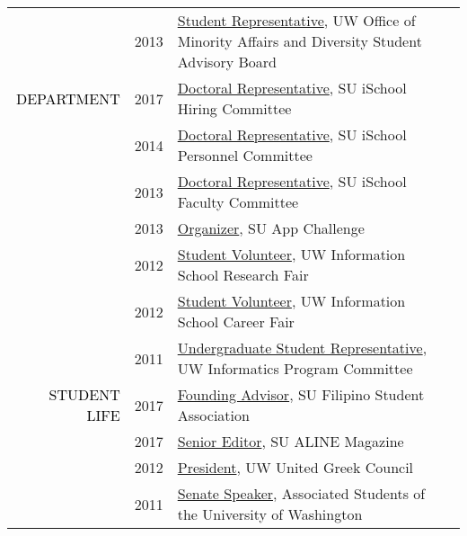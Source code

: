 \documentclass[12pt]{article}
\begin{document}
{{\begin{longtable}{Rp{1.0in}p{0.25in}p{4.75in}}
& \footnotesize{2013} & \href{http://www.washington.edu/omad/2014/05/09/no-longer-invisible-bryan-dosono/}{{Student Representative}}, UW Office of Minority Affairs and Diversity Student Advisory Board \\

\textcolor{black}{\footnotesize{\uppercase{Department}}} & \footnotesize{2017} & 
 \href{http://ischool.syr.edu/facstaff/}{{Doctoral Representative}}, SU iSchool Hiring Committee \\

& \footnotesize{2014} & \href{http://ischool.syr.edu/facstaff/}{{Doctoral Representative}}, SU iSchool Personnel Committee \\

& \footnotesize{2013} & \href{http://ischool.syr.edu/facstaff/}{{Doctoral Representative}}, SU iSchool Faculty Committee \\

& \footnotesize{2013} & \href{http://appchallenge.syr.edu/}{{Organizer}}, SU App Challenge \\

& \footnotesize{2012} & \href{http://ischool.uw.edu/current/career-services}{{Student Volunteer}}, UW Information School Research Fair \\

& \footnotesize{2012} & \href{https://web.archive.org/web/20130104065107/https://ischool.uw.edu/news/2012/11/annual-ischool-research-fair-showcases-faculty-and-student-work}{{Student Volunteer}}, UW Information School Career Fair \\

& \footnotesize{2011} & \href{https://ischool.uw.edu/about/leadership}{{Undergraduate Student Representative}}, UW Informatics Program Committee \\

\textcolor{black}{\footnotesize{\uppercase{Student Life}}} & \footnotesize{2017} & 
 \href{https://www.facebook.com/syracusefsa/}{{Founding Advisor}}, SU Filipino Student Association \\

& \footnotesize{2017} & \href{https://issuu.com/alinemagazine}{{Senior Editor}}, SU ALINE Magazine \\

& \footnotesize{2012} & \href{http://www.dailyuw.com/news/article_3c781595-0b4d-52be-9a6e-b2c956ae72eb.html}{{President}}, UW United Greek Council \\

& \footnotesize{2011} & \href{http://www.dailyuw.com/news/article_da48b049-d2a0-582c-9dfb-4589755ff1e5.html}{{Senate Speaker}}, Associated Students of the University of Washington \\


\end{longtable}}}
\end{document}
